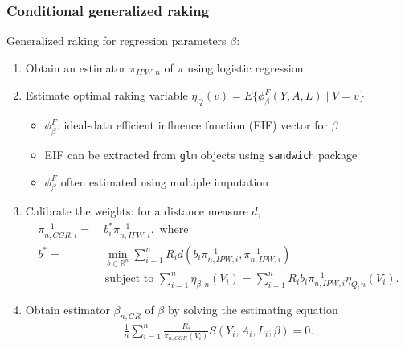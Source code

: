 \documentclass[10pt, table]{beamer}
\begin{document}
\begin{frame} \frametitle{Conditional generalized raking}
  Generalized raking for regression parameters $\beta$: \vspace{-0.4cm}
  \begin{enumerate}[<+->]
    \item Obtain an estimator $\pi_{IPW,n}$ of $\pi$ using logistic regression
    \item Estimate optimal raking variable $\eta_Q(v) = E\{\phi_\beta^F(Y,A,L) \mid V = v\}$
    \begin{itemize}
      \item $\phi_\beta^F$: ideal-data efficient influence function (EIF) vector for $\beta$ \citep{bickel1993efficient}
      \item EIF can be extracted from \texttt{glm} objects using \texttt{sandwich} package
      \item $\phi_\beta^F$ often estimated using multiple imputation \citep{oh2021improved}
    \end{itemize}
    \item Calibrate the weights: for a distance measure $d$, 
    \begin{align*}
      \pi_{n,CGR,i}^{-1} =& \ b_i^*\pi_{n,IPW,i}^{-1}, \text{ where } \label{eq:gr}\\
    b^* =& \ \min_{b \in \mathbb{R}^n}\sum_{i=1}^n R_i d(b_i\pi_{n,IPW,i}^{-1},\pi_{n,IPW,i}^{-1}) \\
    & \text{ subject to }  \sum_{i=1}^n \eta_{\beta,n}(V_i) = \sum_{i=1}^n R_i b_i \pi_{n,IPW,i}^{-1} \eta_{Q,n}(V_i).
    \end{align*}
    \item Obtain estimator $\beta_{n,GR}$ of $\beta$ by solving the estimating equation
    \begin{align*}
    \frac{1}{n}\sum_{i=1}^n\frac{R_i}{\pi_{n,CGR}(V_i)}S(Y_i, A_i,L_i;\beta) = 0.
\end{align*}
  \end{enumerate}
\end{frame}
\end{document}
